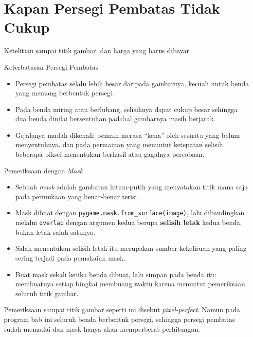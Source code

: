 \documentclass[aspectratio=169,10pt]{beamer}
\begin{document}
\section{Kapan Persegi Pembatas Tidak Cukup}
  {Ketelitian sampai titik gambar, dan harga yang harus dibayar}

\begin{frame}{Keterbatasan Persegi Pembatas}
\begin{center}
\end{center}
\vspace{-0.02cm}
\begin{itemize}
  \item Persegi pembatas selalu lebih besar daripada gambarnya, kecuali untuk
        benda yang memang berbentuk persegi.
  \item Pada benda miring atau berlubang, selisihnya dapat cukup besar sehingga
        dua benda dinilai bersentuhan padahal gambarnya masih berjarak.
  \item Gejalanya mudah dikenali: pemain merasa ``kena'' oleh sesuatu yang
        belum menyentuhnya, dan pada permainan yang menuntut ketepatan selisih
        beberapa piksel menentukan berhasil atau gagalnya percobaan.
\end{itemize}
\end{frame}

\begin{frame}{Pemeriksaan dengan \emph{Mask}}
\begin{itemize}
  \item Sebuah \emph{mask} adalah gambaran hitam-putih yang menyatakan titik
        mana saja pada permukaan yang benar-benar terisi.
  \item Mask dibuat dengan \texttt{pygame.mask.from\_surface(image)}, lalu
        dibandingkan melalui \texttt{overlap} dengan argumen kedua berupa
        \textbf{selisih letak} kedua benda, bukan letak salah satunya.
  \item Salah menentukan selisih letak itu merupakan sumber kekeliruan yang
        paling sering terjadi pada pemakaian mask.
  \item Buat mask sekali ketika benda dibuat, lalu simpan pada benda itu;
        membuatnya setiap bingkai membuang waktu karena menuntut pemeriksaan
        seluruh titik gambar.
\end{itemize}
\vspace{0.16cm}
\begin{kotak}
Pemeriksaan sampai titik gambar seperti ini disebut \emph{pixel-perfect}.
Namun pada program bab ini seluruh benda berbentuk persegi, sehingga persegi
pembatas sudah memadai dan mask hanya akan memperberat perhitungan.
\end{kotak}
\end{frame}
\end{document}
